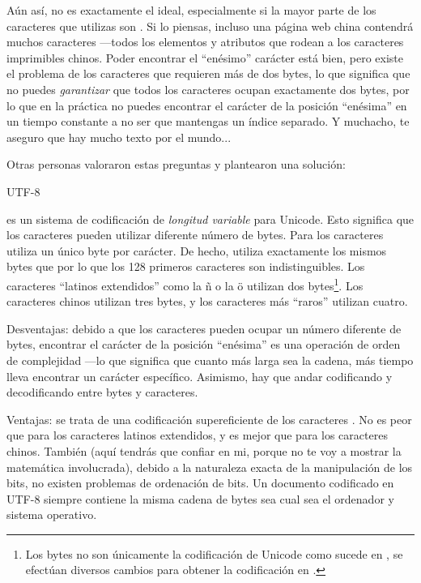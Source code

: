 Aún así,  no es exactamente el ideal, especialmente si la mayor parte de los caracteres que utilizas son . Si lo piensas, incluso una página web china contendrá muchos caracteres  ---todos los elementos y atributos que rodean a los caracteres imprimibles chinos. Poder encontrar el ``enésimo'' carácter está bien, pero existe el problema de los caracteres que requieren más de dos bytes, lo que significa que no puedes \emph{garantizar} que todos los caracteres ocupan exactamente dos bytes, por lo que en la práctica no puedes encontrar el carácter de la posición ``enésima'' en un tiempo constante a no ser que mantengas un índice separado. Y muchacho, te aseguro que hay mucho texto  por el mundo...

Otras personas valoraron estas preguntas y plantearon una solución:

{

\Huge \center UTF-8

}

 es un sistema de codificación de \emph{longitud variable} para Unicode. Esto significa que los caracteres pueden utilizar diferente número de bytes. Para los caracteres  utiliza un único byte por carácter. De hecho, utiliza exactamente los mismos bytes que  por lo que los 128 primeros caracteres son indistinguibles. Los caracteres ``latinos extendidos'' como la ñ o la ö utilizan dos bytes\footnote{Los bytes no son únicamente la codificación de Unicode como sucede en , se efectúan diversos cambios para obtener la codificación en .}. Los caracteres chinos utilizan tres bytes, y los caracteres más ``raros'' utilizan cuatro.

Desventajas: debido a que los caracteres pueden ocupar un número diferente de bytes, encontrar el carácter de la posición ``enésima'' es una operación de orden de complejidad  ---lo que significa que cuanto más larga sea la cadena, más tiempo lleva encontrar un carácter específico. Asimismo, hay que andar codificando y decodificando entre bytes y caracteres.

Ventajas: se trata de una codificación supereficiente de los caracteres . No es peor que  para los caracteres latinos extendidos, y es mejor que  para los caracteres chinos. También (aquí tendrás que confiar en mi, porque no te voy a mostrar la matemática involucrada), debido a la naturaleza exacta de la manipulación de los bits, no existen problemas de ordenación de bits. Un documento codificado en UTF-8 siempre contiene la misma cadena de bytes sea cual sea el ordenador y sistema operativo.


